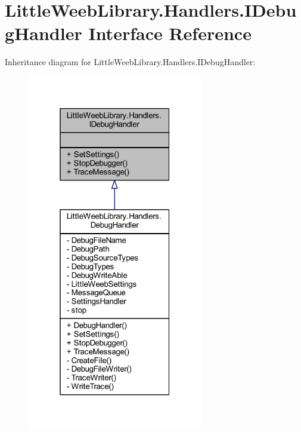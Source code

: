 \hypertarget{interface_little_weeb_library_1_1_handlers_1_1_i_debug_handler}{}\section{Little\+Weeb\+Library.\+Handlers.\+I\+Debug\+Handler Interface Reference}
\label{interface_little_weeb_library_1_1_handlers_1_1_i_debug_handler}


Inheritance diagram for Little\+Weeb\+Library.\+Handlers.\+I\+Debug\+Handler\+:\nopagebreak
\begin{figure}[H]
\begin{center}
\leavevmode
\includegraphics[width=217pt]{interface_little_weeb_library_1_1_handlers_1_1_i_debug_handler__inherit__graph}
\end{center}
\end{figure}


